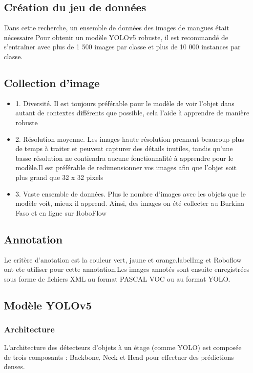 \documentclass{article}
\begin{document}
	\subsection{Création du jeu de données}
	Dans cette recherche, un ensemble de données des images de mangues était nécessaire
	Pour obtenir un modèle YOLOv5 robuste, il est recommandé
	de s’entraîner avec plus de 1 500 images par classe et plus de 10 000 instances par classe.
	\subsection{Collection d'image}
	\begin{itemize}
		\item 1. Diversité.
		Il est toujours préférable pour le modèle de voir l’objet dans autant de contextes différents
		que possible, cela l’aide à apprendre de manière robuste
		\item 2. Résolution moyenne.
		Les images haute résolution prennent beaucoup plus de temps à traiter et peuvent capturer
		des détails inutiles, tandis qu’une basse résolution ne contiendra aucune fonctionnalité à apprendre
		pour le modèle.Il est préférable de redimensionner vos images afin que l’objet soit plus grand que 32 x 32
		pixels
		\item 3. Vaste ensemble de données.
		Plus le nombre d’images avec les objets que le modèle voit, mieux il apprend. Ainsi, des images on été collecter au Burkina Faso et en ligne sur RoboFlow	
	\end{itemize}
	
	\subsection{Annotation}
	Le critère d'anotation est la couleur vert, jaune et orange.labelImg et Roboflow ont ete utiliser pour cette annotation.Les images annotés sont ensuite
	enregistrées sous forme de fichiers XML au format PASCAL VOC ou au format YOLO.
	
	\subsection{Modèle YOLOv5}
	\subsubsection{Architecture}
	L’architecture des détecteurs d’objets à un étage (comme YOLO) est composée de trois
	composants : Backbone, Neck et Head pour effectuer des prédictions denses.
	
\end{document}
